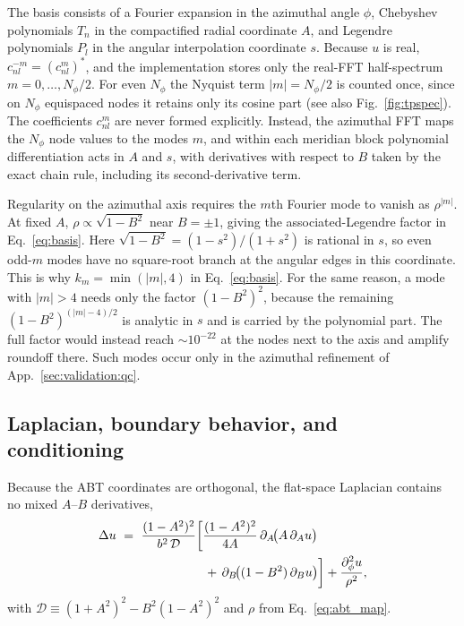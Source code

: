 \documentclass[
  aps,
  prd,
  twocolumn,
  10pt,
  amsmath,
  amssymb,
  nofootinbib,
  superscriptaddress,
  floatfix,
]{revtex4-2}
\begin{document}
The basis consists of a Fourier expansion in the azimuthal angle $\phi$, Chebyshev polynomials $T_n$ in the compactified radial coordinate $A$, and Legendre polynomials $P_l$ in the angular interpolation coordinate $s$.
Because $u$ is real, $c^{-m}_{nl}=(c^{m}_{nl})^{*}$, and the implementation stores only the real-FFT half-spectrum $m=0,\dots,N_\phi/2$.
For even $N_\phi$ the Nyquist term $|m|=N_\phi/2$ is counted once, since on $N_\phi$ equispaced nodes it retains only its cosine part (see also Fig.~\ref{fig:tpspec}).
The coefficients $c_{nl}^m$ are never formed explicitly. Instead, the azimuthal FFT maps the $N_\phi$ node values to the modes $m$, and within each meridian block polynomial differentiation acts in $A$ and $s$, with derivatives with respect to $B$ taken by the exact chain rule, including its second-derivative term.

Regularity on the azimuthal axis requires the $m$th Fourier mode to vanish as $\rho^{|m|}$.
At fixed $A$, $\rho\propto\sqrt{1-B^2}$ near $B=\pm1$, giving the associated-Legendre factor in Eq.~\eqref{eq:basis}.
Here $\sqrt{1-B^2}=(1-s^2)/(1+s^2)$ is rational in $s$, so even odd-$m$ modes have no square-root branch at the angular edges in this coordinate.
This is why $k_m=\min(|m|,4)$ in Eq.~\eqref{eq:basis}.
For the same reason, a mode with $|m|>4$ needs only the factor $(1-B^2)^{2}$, because the remaining $(1-B^2)^{(|m|-4)/2}$ is analytic in $s$ and is carried by the polynomial part. The full factor would instead reach $\sim10^{-22}$ at the nodes next to the axis and amplify roundoff there.
Such modes occur only in the azimuthal refinement of App.~\ref{sec:validation:qc}.

\subsection{Laplacian, boundary behavior, and conditioning}
\label{sec:solverdetails:laplacian}

Because the ABT coordinates are orthogonal, the flat-space Laplacian contains no mixed $A$--$B$ derivatives,
\begin{equation}
\begin{aligned}
   \Delta u \ &= \ \frac{(1-A^2)^2}{b^2\,\mathcal{D}} \bigg[
    \frac{(1-A^2)^2}{4A}\,\partial_A\!\big(A\,\partial_A u\big) \\
    &\hspace{23mm} \, + \, \partial_B\!\big((1-B^2)\,\partial_B u\big)\bigg]
     + \frac{\partial_{\phi}^2 u}{\rho^{2}},
\end{aligned}
  \label{eq:abt_laplacian}
\end{equation}
with $\mathcal{D} \equiv (1+A^2)^2 - B^2(1-A^2)^2$ and $\rho$ from
Eq.~\eqref{eq:abt_map}.
\end{document}
